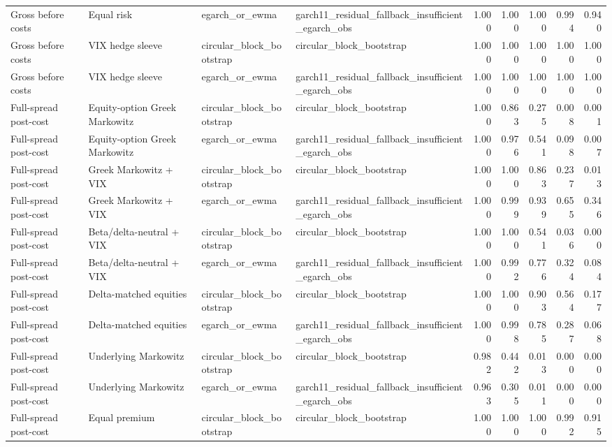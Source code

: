 \begin{tabular}{llllrrrrr}
Gross before costs & Equal risk & egarch\_or\_ewma & garch11\_residual\_fallback\_insufficient\_egarch\_obs & 1.000 & 1.000 & 1.000 & 0.994 & 0.940 \\
Gross before costs & VIX hedge sleeve & circular\_block\_bootstrap & circular\_block\_bootstrap & 1.000 & 1.000 & 1.000 & 1.000 & 1.000 \\
Gross before costs & VIX hedge sleeve & egarch\_or\_ewma & garch11\_residual\_fallback\_insufficient\_egarch\_obs & 1.000 & 1.000 & 1.000 & 1.000 & 1.000 \\
Full-spread post-cost & Equity-option Greek Markowitz & circular\_block\_bootstrap & circular\_block\_bootstrap & 1.000 & 0.863 & 0.275 & 0.008 & 0.001 \\
Full-spread post-cost & Equity-option Greek Markowitz & egarch\_or\_ewma & garch11\_residual\_fallback\_insufficient\_egarch\_obs & 1.000 & 0.976 & 0.541 & 0.098 & 0.007 \\
Full-spread post-cost & Greek Markowitz + VIX & circular\_block\_bootstrap & circular\_block\_bootstrap & 1.000 & 1.000 & 0.863 & 0.237 & 0.013 \\
Full-spread post-cost & Greek Markowitz + VIX & egarch\_or\_ewma & garch11\_residual\_fallback\_insufficient\_egarch\_obs & 1.000 & 0.999 & 0.939 & 0.655 & 0.346 \\
Full-spread post-cost & Beta/delta-neutral + VIX & circular\_block\_bootstrap & circular\_block\_bootstrap & 1.000 & 1.000 & 0.541 & 0.036 & 0.000 \\
Full-spread post-cost & Beta/delta-neutral + VIX & egarch\_or\_ewma & garch11\_residual\_fallback\_insufficient\_egarch\_obs & 1.000 & 0.992 & 0.776 & 0.324 & 0.084 \\
Full-spread post-cost & Delta-matched equities & circular\_block\_bootstrap & circular\_block\_bootstrap & 1.000 & 1.000 & 0.903 & 0.564 & 0.177 \\
Full-spread post-cost & Delta-matched equities & egarch\_or\_ewma & garch11\_residual\_fallback\_insufficient\_egarch\_obs & 1.000 & 0.998 & 0.785 & 0.287 & 0.068 \\
Full-spread post-cost & Underlying Markowitz & circular\_block\_bootstrap & circular\_block\_bootstrap & 0.982 & 0.442 & 0.013 & 0.000 & 0.000 \\
Full-spread post-cost & Underlying Markowitz & egarch\_or\_ewma & garch11\_residual\_fallback\_insufficient\_egarch\_obs & 0.963 & 0.305 & 0.011 & 0.000 & 0.000 \\
Full-spread post-cost & Equal premium & circular\_block\_bootstrap & circular\_block\_bootstrap & 1.000 & 1.000 & 1.000 & 0.992 & 0.915 \\

\end{tabular}
